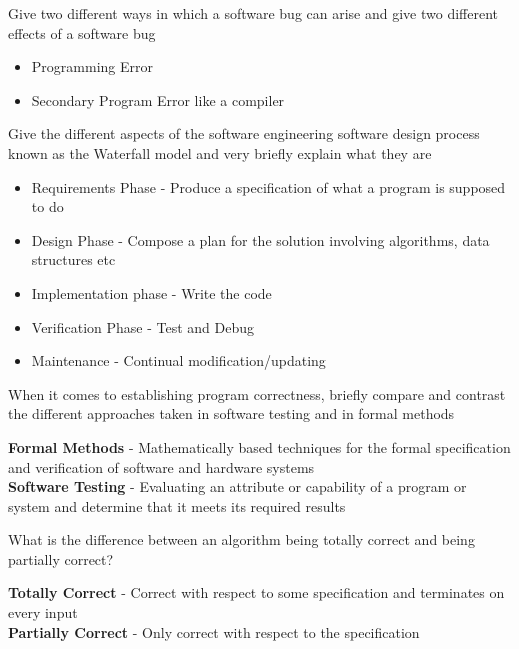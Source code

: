 \documentclass[addpoints]{exam}
\begin{document}
\begin{questions}
\question[2]Give two different ways in which a software bug can arise and give two different effects of a software bug
\begin{solution}[2in]
	\begin{itemize}
		\item Programming Error
		\item Secondary Program Error like a compiler
	\end{itemize}
\end{solution}

\question[5]Give the different aspects of the software engineering software design process known as the Waterfall model and very briefly explain what they are
\begin{solution}[2in]
	\begin{itemize}
		\item Requirements Phase - Produce a specification of what a program is supposed to do
		\item Design Phase - Compose a plan for the solution involving algorithms, data structures etc
		\item Implementation phase - Write the code
		\item Verification Phase - Test and Debug
		\item Maintenance - Continual modification/updating
	\end{itemize}
\end{solution}

\question[2]When it comes to establishing program correctness, briefly compare and contrast the different approaches taken in software testing and in formal methods
\begin{solution}[2in]
	\textbf{Formal Methods} - Mathematically based techniques for the formal specification and verification of software and hardware systems\\
	\textbf{Software Testing} - Evaluating an attribute or capability of a program or system and determine that it meets its required results
\end{solution}

\question[2]What is the difference between an algorithm being totally correct and being partially correct?
\begin{solution}[2in]
	\textbf{Totally Correct} - Correct with respect to some specification and terminates on every input\\
	\textbf{Partially Correct} - Only correct with respect to the specification 
\end{solution}


\end{questions}
\end{document}
